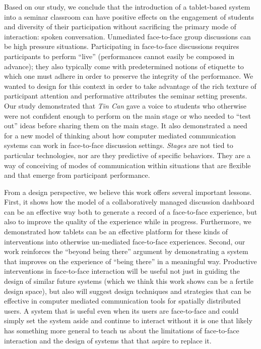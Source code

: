 Based on our study, we conclude that the introduction of a tablet-based system into a seminar classroom can have positive effects on the engagement of students and diversity of their participation without sacrificing the primary mode of interaction: spoken conversation.  Unmediated face-to-face group discussions can be high pressure situations.  Participating in face-to-face discussions requires participants to perform ``live'' (performances cannot easily be composed in advance); they also typically come with predetermined notions of etiquette to which one must adhere in order to preserve the integrity of the performance. We wanted to design for this context in order to take advantage of the rich texture of participant attention and performative attributes the seminar setting presents. Our study demonstrated that \emph{Tin Can} gave a voice to students who otherwise were not confident enough to perform on the main stage or who needed to ``test out'' ideas before sharing them on the main stage. It also demonstrated a need for a new model of thinking about how computer mediated communication systems can work in face-to-face discussion settings.  \emph{Stages} are not tied to particular technologies, nor are they predictive of specific behaviors.  They are a way of conceiving of modes of communication within situations that are flexible and that emerge from participant performance.  



From a design perspective, we believe this work offers several important lessons. First, it shows how the model of a collaboratively managed discussion dashboard can be an effective way both to generate a record of a face-to-face experience, but also to improve the quality of the experience while in progress. Furthermore, we demonstrated how tablets can be an effective platform for these kinds of interventions into otherwise un-mediated face-to-face experiences. Second, our work reinforces the ``beyond being there'' argument \citep{Hollan:1992tz} by demonstrating a system that improves on the experience of ``being there'' in a meaningful way. Productive interventions in face-to-face interaction will be useful not just in guiding the design of similar future systems (which we think this work shows can be a fertile design space), but also will suggest design techniques and strategies that can be effective in computer mediated communication tools for spatially distributed users. A system that is useful even when its users are face-to-face and could simply set the system aside and continue to interact without it is one that likely has something more general to teach us about the limitations of face-to-face interaction and the design of systems that that aspire to replace it.
